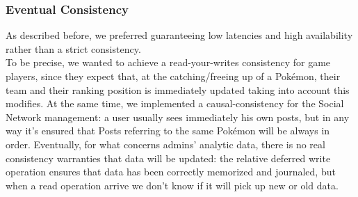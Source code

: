 \subsubsection{Eventual Consistency}
As described before, we preferred guaranteeing low latencies and high availability rather than a strict consistency.\\ 
To be precise, we wanted to achieve a read-your-writes consistency for game players, since they expect that, at the catching/freeing up of a Pokémon, their team and their ranking position is immediately updated taking into account this modifies.
At the same time, we implemented a causal-consistency for the Social Network management: a user usually sees immediately his own posts, but in any way it’s ensured that Posts referring to the same Pokémon will be always in order.
Eventually, for what concerns admins’ analytic data, there is no real consistency warranties that data will be updated: the relative deferred write operation ensures that data has been correctly memorized and journaled, but when a read operation arrive we don’t know if it will pick up new or old data.
